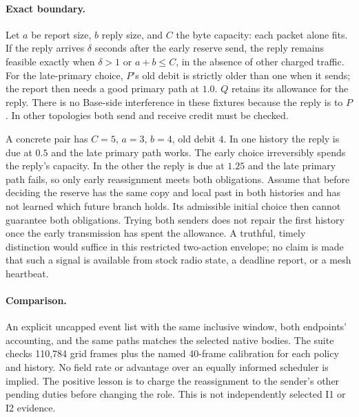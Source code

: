 \documentclass[11pt]{article}
\begin{document}
\paragraph{Exact boundary.}
Let $a$ be report size, $b$ reply size, and $C$ the byte capacity:
each packet alone fits. If the reply arrives $\delta$ seconds after
the early reserve send, the reply remains feasible exactly when
$\delta>1$ or $a+b\le C$, in the absence of other charged traffic.
For the late-primary choice, $P$'s old debit is strictly older than one
when it sends; the report then needs a good primary path at $1.0$.
$Q$ retains its allowance for the reply. There is no Base-side
interference in these fixtures because the reply is to $P$. In other
topologies both send and receive credit must be checked.

A concrete pair has $C=5$, $a=3$, $b=4$, old debit $4$. In one history
the reply is due at $0.5$ and the late primary path works. The
early choice irreversibly spends the reply's capacity. In the other
the reply is due at $1.25$ and the late primary path fails, so only
early reassignment meets both obligations. Assume that before deciding
the reserve has the same copy and local past in both histories and has
not learned which future branch holds. Its admissible initial choice
then cannot guarantee both obligations. Trying both senders does not
repair the first history once the early transmission has spent the
allowance. A truthful, timely distinction would suffice in this
restricted two-action envelope; no claim is made that such a signal
is available from stock radio state, a deadline report, or a mesh heartbeat.

\paragraph{Comparison.}
An explicit uncapped event list with the same inclusive window,
both endpoints' accounting, and the same paths matches the selected
native bodies. The suite checks 110,784 grid frames plus the named
40-frame calibration for each policy and history. No field rate or
advantage over an equally informed scheduler is implied. The positive
lesson is to charge the reassignment to the sender's other pending
duties before changing the role. This is not independently selected
I1 or I2 evidence.
\end{document}
